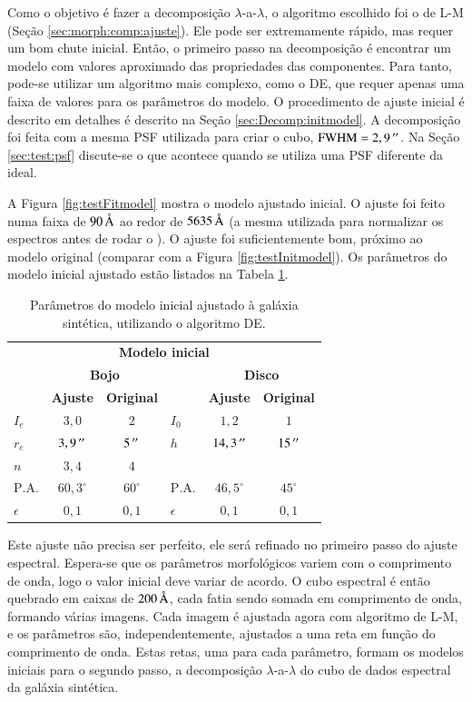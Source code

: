 Como o objetivo é fazer a decomposição $\lambda$-a-$\lambda$, o algoritmo
escolhido foi o de L-M (Seção \ref{sec:morph:comp:ajuste}). Ele pode ser
extremamente rápido, mas requer um bom chute inicial. Então, o primeiro passo
na decomposição é encontrar um modelo com valores aproximado das propriedades
das componentes. Para tanto, pode-se utilizar um algoritmo mais complexo, como o
DE, que requer apenas uma faixa de valores para os parâmetros do modelo.
O procedimento de ajuste inicial é descrito em detalhes é descrito na Seção
\ref{sec:Decomp:initmodel}. A decomposição foi feita com a mesma PSF utilizada
para criar o cubo, $\mathrm{FWHM} = 2,9\,^{\prime\prime}$. Na Seção \ref{sec:test:psf}
discute-se o que acontece quando se utiliza uma PSF diferente da ideal.

A Figura \ref{fig:testFitmodel} mostra o modelo ajustado inicial. O ajuste
foi feito numa faixa de $90\,\text{\normalfont\AA}$ ao redor de $5635\,\text{\normalfont\AA}$ (a
mesma utilizada para normalizar os espectros antes de rodar o \starlight).
O ajuste foi suficientemente bom, próximo ao modelo original (comparar com a
Figura \ref{fig:testInitmodel}). Os parâmetros do modelo inicial ajustado estão
listados na Tabela \ref{tab:testeModeloInicial}.

\begin{table}
\begin{tabular}{ l c c l c c }
  \hline
  \multicolumn{6}{c}{\textbf{Modelo inicial}} \\
  & \multicolumn{2}{c}{\textbf{Bojo}} & & \multicolumn{2}{c}{\textbf{Disco}} \\
  & \textbf{Ajuste} & \textbf{Original} & & \textbf{Ajuste} & \textbf{Original} \\
  \hline
  $I_e$ & $3,0$ & $2$ & $I_0$ & $1,2$ & $1$ \\
  $r_e$ & $3,9\,^{\prime\prime}$ & $5\,^{\prime\prime}$ & $h$ & $14,3\,^{\prime\prime}$ & $15\,^{\prime\prime}$\\
  $n$ & $3,4$ & $4$ & & & \\
  $\mathrm{P.A.}$ & $60,3^\circ$ & $60^\circ$ & $\mathrm{P.A.}$ & $46,5^\circ$ &
  $45^\circ$ \\
  $\epsilon$ & $0,1$ & $0,1$ & $\epsilon$ & $0,1$ & $0,1$ \\
  \hline
\end{tabular}
\caption[Modelo inicial ajustado à galáxia sintética]
{Parâmetros do modelo inicial ajustado à galáxia sintética, utilizando o
algoritmo DE.}
\label{tab:testeModeloInicial}
\end{table}


Este ajuste não precisa ser perfeito, ele será refinado no primeiro passo do
ajuste espectral. Espera-se que os  parâmetros morfológicos variem com o
comprimento de onda, logo o valor inicial deve variar de acordo. O cubo
espectral é então quebrado em caixas de $200\,\text{\normalfont\AA}$, cada fatia sendo
somada em comprimento de onda, formando várias imagens. Cada imagem é ajustada
agora com algoritmo de L-M, e os parâmetros são, independentemente, ajustados a
uma reta em função do comprimento de onda. Estas retas, uma para cada parâmetro,
formam os modelos iniciais para o segundo passo, a decomposição
$\lambda$-a-$\lambda$ do cubo de dados espectral da galáxia sintética.

